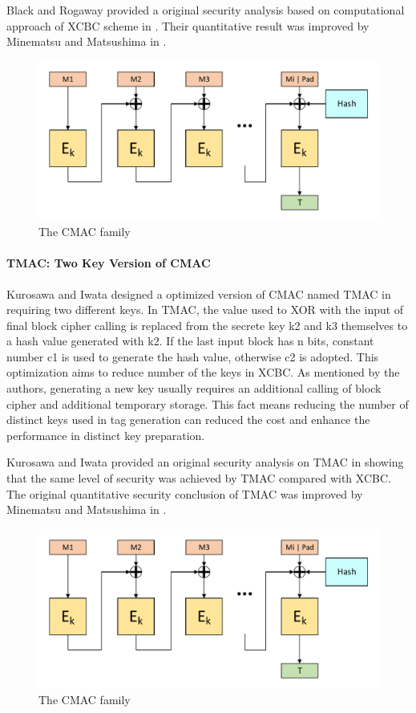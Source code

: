 \documentclass{article}
\begin{document}
Black and Rogaway provided a original security analysis based on computational approach of XCBC scheme in \cite{xcbc}. Their quantitative result was improved by Minematsu and Matsushima in \cite{new}. 

\begin{figure}[htbp]
\centering
\includegraphics[scale=0.5]{./diagrams/cmac.pdf}
\caption{The CMAC family}
\label{fig:TMAC}
\end{figure}
\paragraph{TMAC: Two Key Version of CMAC}
Kurosawa and Iwata designed a optimized version of CMAC named TMAC in \cite{tmac} requiring two different keys.  
In TMAC,  the value used to XOR with the input of final block cipher calling is replaced from the secrete key k2 and k3 themselves to a hash value generated with k2. If the last input block has n bits, constant number c1 is used to generate the hash value, otherwise c2 is adopted. This optimization aims to reduce number of the keys in XCBC. As mentioned by the authors, generating a new key usually requires an additional calling of block cipher and additional temporary storage. This fact means reducing the number of distinct keys used in tag generation can reduced the cost and enhance the performance in distinct key preparation. 

Kurosawa and Iwata provided an original security analysis on TMAC in \cite{tmac} showing that the same level of security was achieved by TMAC compared with XCBC. The original quantitative security conclusion of TMAC was improved by Minematsu and Matsushima in \cite{new}. 
\begin{figure}[htbp]
\centering
\includegraphics[scale=0.5]{./diagrams/cmac.pdf}
\caption{The CMAC family}
\label{fig:OMAC}
\end{figure}
\end{document}
